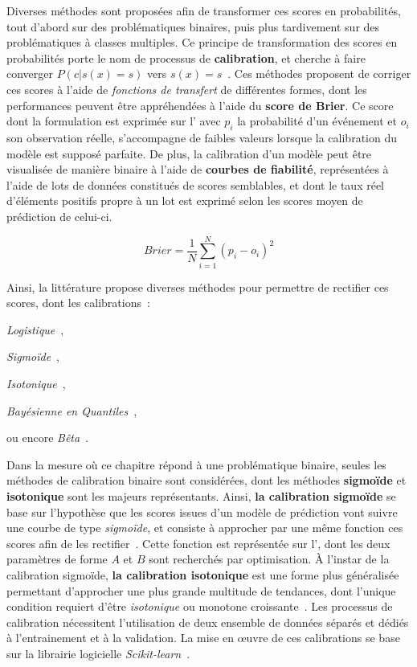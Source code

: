 Diverses méthodes sont proposées afin de transformer ces scores en probabilités, tout d'abord sur des problématiques binaires, puis plus tardivement sur des problématiques à classes multiples. Ce principe de transformation des scores en probabilités porte le nom de processus de \textbf{calibration}, et cherche à faire converger $P(c|s(x)=s)$ vers $s(x)=s$~\cite{Zadrozny2002}. Ces méthodes proposent de corriger ces scores à l'aide de \textit{fonctions de transfert} de différentes formes, dont les performances peuvent être appréhendées à l'aide du \textbf{score de Brier}. Ce score dont la formulation est exprimée sur l' avec $p_i$ la probabilité d'un événement et $o_i$ son observation réelle, s'accompagne de faibles valeurs lorsque la calibration du modèle est supposé parfaite. De plus, la calibration d'un modèle peut être visualisée de manière binaire à l'aide de \textbf{courbes de fiabilité}, représentées à l'aide de lots de données constitués de scores semblables, et dont le taux réel d'éléments positifs propre à un lot est exprimé selon les scores moyen de prédiction de celui-ci.\par

\begin{equation} 
    \label{eq:brier_score}
    Brier = \frac{1}{N}\sum\limits _{i=1}^{N}(p_i-o_i)^2 
\end{equation}

Ainsi, la littérature propose diverses méthodes pour permettre de rectifier ces scores, dont les calibrations~:
\begin{inlinerate}
    \item \textit{Logistique}~\cite{Friedman2000},
    \item \textit{Sigmoïde}~\cite{Platt2000,kull2017b},
    \item \textit{Isotonique}~\cite{Zadrozny2002},
    \item \textit{Bayésienne en Quantiles}~\cite{Naeini2015},
    \item ou encore \textit{Bêta}~\cite{Kull2017}.
\end{inlinerate} Dans la mesure où ce chapitre répond à une problématique binaire, seules les méthodes de calibration binaire sont considérées, dont les méthodes \textbf{sigmoïde} et \textbf{isotonique} sont les majeurs représentants. Ainsi, \textbf{la calibration sigmoïde} se base sur l'hypothèse que les scores issues d'un modèle de prédiction vont suivre une courbe de type \textit{sigmoïde}, et consiste à approcher par une même fonction ces scores afin de les rectifier~\cite{Niculescu2005}. Cette fonction est représentée sur l', dont les deux paramètres de forme $A$ et $B$ sont recherchés par optimisation. À l'instar de la calibration sigmoïde, \textbf{la calibration isotonique} est une forme plus généralisée permettant d'approcher une plus grande multitude de tendances, dont l'unique condition requiert d'être \textit{isotonique} ou monotone croissante~\cite{Niculescu2005}. Les processus de calibration nécessitent l'utilisation de deux ensemble de données séparés et dédiés à l'entrainement et à la validation. La mise en œuvre de ces calibrations se base sur la librairie logicielle \textit{Scikit-learn}~\cite{pedregosa2011}.\par

